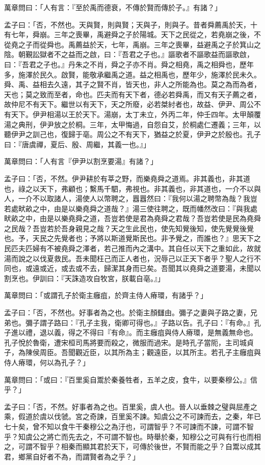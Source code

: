 \documentclass[12pt,a4paper]{ctexbook}
\begin{document}
萬章問曰：「人有言：『至於禹而德衰，不傳於賢而傳於子。』有諸？」\par
孟子曰：「否，不然也。天與賢，則與賢；天與子，則與子。昔者舜薦禹於天，十有七年，舜崩。三年之喪畢，禹避舜之子於陽城。天下之民從之，若堯崩之後，不從堯之子而從舜也。禹薦益於天，七年，禹崩。三年之喪畢，益避禹之子於箕山之陰。朝覲訟獄者不之益而之啟，曰：『吾君之子也。』謳歌者不謳歌益而謳歌啟，曰：『吾君之子也。』丹朱之不肖，舜之子亦不肖。舜之相堯，禹之相舜也，歷年多，施澤於民久。啟賢，能敬承繼禹之道。益之相禹也，歷年少，施澤於民未久。舜、禹、益相去久遠，其子之賢不肖，皆天也，非人之所能為也。莫之為而為者，天也；莫之致而至者，命也。匹夫而有天下者，德必若舜禹，而又有天子薦之者，故仲尼不有天下。繼世以有天下，天之所廢，必若桀紂者也，故益、伊尹、周公不有天下。伊尹相湯以王於天下。湯崩，太丁未立，外丙二年，仲壬四年。太甲顛覆湯之典刑，伊尹放之於桐。三年，太甲悔過，自怨自艾，於桐處仁遷義；三年，以聽伊尹之訓己也，復歸于亳。周公之不有天下，猶益之於夏，伊尹之於殷也。孔子曰：『唐虞禪，夏后、殷、周繼，其義一也。』」\par
萬章問曰：「人有言『伊尹以割烹要湯』有諸？」\par
孟子曰：「否，不然。伊尹耕於有莘之野，而樂堯舜之道焉。非其義也，非其道也，祿之以天下，弗顧也；繫馬千駟，弗視也。非其義也，非其道也，一介不以與人，一介不以取諸人，湯使人以幣聘之，囂囂然曰：『我何以湯之聘幣為哉？我豈若處畎畝之中，由是以樂堯舜之道哉？』湯三使往聘之，既而幡然改曰：『與我處畎畝之中，由是以樂堯舜之道，吾豈若使是君為堯舜之君哉？吾豈若使是民為堯舜之民哉？吾豈若於吾身親見之哉？天之生此民也，使先知覺後知，使先覺覺後覺也。予，天民之先覺者也；予將以斯道覺斯民也。非予覺之，而誰也？』思天下之民匹夫匹婦有不被堯舜之澤者，若己推而內之溝中。其自任以天下之重如此，故就湯而說之以伐夏救民。吾未聞枉己而正人者也，況辱己以正天下者乎？聖人之行不同也，或遠或近，或去或不去，歸潔其身而已矣。吾聞其以堯舜之道要湯，未聞以割烹也。伊訓曰：『天誅造攻自牧宮，朕載自亳。』」\par
萬章問曰：「或謂孔子於衛主癰疽，於齊主侍人瘠環，有諸乎？」\par
孟子曰：「否，不然也。好事者為之也。於衛主顏讎由。彌子之妻與子路之妻，兄弟也。彌子謂子路曰：『孔子主我，衛卿可得也。』子路以告。孔子曰：『有命。』孔子進以禮，退以義，得之不得曰『有命』。而主癰疽與侍人瘠環，是無義無命也。孔子悅於魯衛，遭宋桓司馬將要而殺之，微服而過宋。是時孔子當阨，主司城貞子，為陳侯周臣。吾聞觀近臣，以其所為主；觀遠臣，以其所主。若孔子主癰疽與侍人瘠環，何以為孔子？」\par
萬章問曰：「或曰：『百里奚自鬻於秦養牲者，五羊之皮，食牛，以要秦穆公。』信乎？」\par
孟子曰：「否，不然。好事者為之也。百里奚，虞人也。晉人以垂棘之璧與屈產之乘，假道於虞以伐虢。宮之奇諫，百里奚不諫。知虞公之不可諫而去，之秦，年已七十矣，曾不知以食牛干秦穆公之為汙也，可謂智乎？不可諫而不諫，可謂不智乎？知虞公之將亡而先去之，不可謂不智也。時舉於秦，知穆公之可與有行也而相之，可謂不智乎？相秦而顯其君於天下，可傳於後世，不賢而能之乎？自鬻以成其君，鄉黨自好者不為，而謂賢者為之乎？」\par
\end{document}
